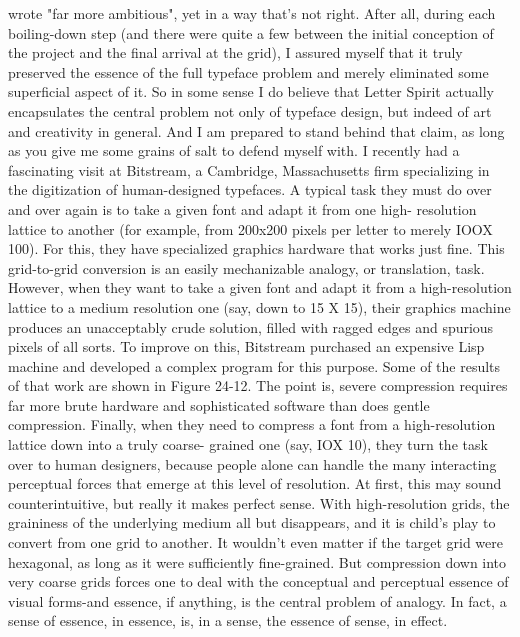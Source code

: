 wrote "far more ambitious", yet in a way that's not right. After all, during each
boiling-down step (and there were quite a few between the initial conception of the
project and the final arrival at the grid), I assured myself that it truly preserved the
essence of the full typeface problem and merely eliminated some superficial aspect of
it. So in some sense I do believe that Letter Spirit actually encapsulates the central
problem not only of typeface design, but indeed of art and creativity in general. And I
am prepared to stand behind that claim, as long as you give me some grains of salt to
defend myself with.
        I recently had a fascinating visit at Bitstream, a Cambridge, Massachusetts
firm specializing in the digitization of human-designed typefaces. A typical task they
must do over and over again is to take a given font and adapt it from one high-
resolution lattice to another (for example, from 200x200 pixels per letter to merely
IOOX 100). For this, they have specialized graphics hardware that works just fine.
This grid-to-grid conversion is an easily mechanizable analogy, or translation, task.
However, when they want to take a given font and adapt it from a high-resolution
lattice to a medium resolution one (say, down to 15 X 15), their graphics machine
produces an unacceptably crude solution, filled with ragged edges and spurious pixels
of all sorts. To improve on this, Bitstream purchased an expensive Lisp machine and
developed a complex program for this purpose. Some of the results of that work are
shown in Figure 24-12. The point is, severe compression requires far more brute
hardware and sophisticated software than does gentle compression. Finally, when they
need to compress a font from a high-resolution lattice down into a truly coarse-
grained one (say, IOX 10), they turn the task over to human designers, because people
alone can handle the many interacting perceptual forces that emerge at this level of
resolution.
        At first, this may sound counterintuitive, but really it makes perfect sense.
With high-resolution grids, the graininess of the underlying medium all but
disappears, and it is child's play to convert from one grid to another. It wouldn't even
matter if the target grid were hexagonal, as long as it were sufficiently fine-grained.
But compression down into very coarse grids forces one to deal with the conceptual
and perceptual essence of visual forms-and essence, if anything, is the central problem
of analogy. In fact, a sense of essence, in essence, is, in a sense, the essence of sense,
in effect.

